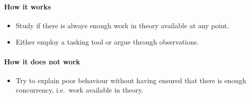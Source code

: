 \paragraph*{How it works}

\begin{itemize}[noitemsep]
  \item[$\boxplus$] Study if there is always enough work in theory available at any point.
  \item[$\boxplus$] Either employ a tasking tool or argue through observations.
\end{itemize}


\paragraph*{How it does not work}

\begin{itemize}[noitemsep]
  \item[$\boxminus$] Try to explain poor behaviour without having ensured that there is enough concurrency, i.e.~work available in theory.
\end{itemize}

